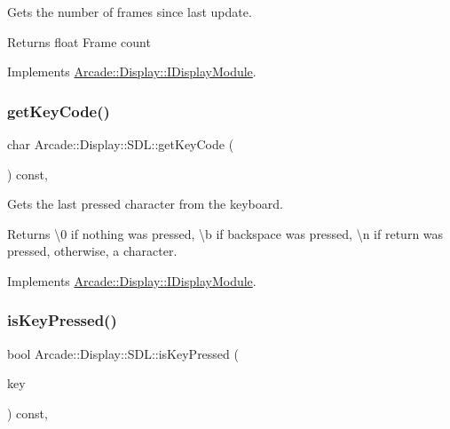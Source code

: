 Gets the number of frames since last update. 

\begin{DoxyReturn}{Returns}
float Frame count 
\end{DoxyReturn}


Implements \mbox{\hyperlink{classArcade_1_1Display_1_1IDisplayModule_aab078d82e6fdd32682553947c20226ac}{Arcade\+::\+Display\+::\+I\+Display\+Module}}.

\mbox{\label{classArcade_1_1Display_1_1SDL_a3ba94b49b72c9e189f52af7b97f4ad91}} 
\subsubsection{\texorpdfstring{getKeyCode()}{getKeyCode()}}
{\footnotesize\ttfamily char Arcade\+::\+Display\+::\+S\+D\+L\+::get\+Key\+Code (\begin{DoxyParamCaption}{ }\end{DoxyParamCaption}) const\hspace{0.3cm}{\ttfamily [final]}, {\ttfamily [virtual]}}



Gets the last pressed character from the keyboard. 

\begin{DoxyReturn}{Returns}
\textbackslash{}0 if nothing was pressed, \textbackslash{}b if backspace was pressed, \textbackslash{}n if return was pressed, otherwise, a character. 
\end{DoxyReturn}


Implements \mbox{\hyperlink{classArcade_1_1Display_1_1IDisplayModule_a403f8a0f065dad707a881ef3cee79805}{Arcade\+::\+Display\+::\+I\+Display\+Module}}.

\mbox{\label{classArcade_1_1Display_1_1SDL_ab7a692d8968af7633a92042ee006b83a}} 
\subsubsection{\texorpdfstring{isKeyPressed()}{isKeyPressed()}}
{\footnotesize\ttfamily bool Arcade\+::\+Display\+::\+S\+D\+L\+::is\+Key\+Pressed (\begin{DoxyParamCaption}\item[{\mbox{\hyperlink{classArcade_1_1Display_1_1IDisplayModule_a8da3f6b309ca0581473ae8cc8789b619}{I\+Display\+Module\+::\+Keys}}}]{key }\end{DoxyParamCaption}) const\hspace{0.3cm}{\ttfamily [final]}, {\ttfamily [virtual]}}



